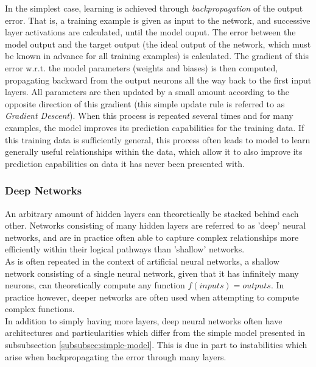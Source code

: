 In the simplest case, learning is achieved through \textit{backpropagation} of the output error. That is, a training example is given as input to the network, and successive layer activations are calculated, until the model ouput. The error between the model output and the target output (the ideal output of the network, which must be known in advance for all training examples) is calculated. The gradient of this error w.r.t. the model parameters (weights and biases) is then computed, propagating backward from the output neurons all the way back to the first input layers. All parameters are then updated by a small amount according to the opposite direction of this gradient (this simple update rule is referred to as \textit{Gradient Descent}). When this process is repeated several times and for many examples, the model improves its prediction capabilities for the training data. If this training data is sufficiently general, this process often leads to model to learn generally useful relationships within the data, which allow it to also improve its prediction capabilities on data it has never been presented with.\\

\subsubsection{Deep Networks}

An arbitrary amount of hidden layers can theoretically be stacked behind each other. Networks consisting of many hidden layers are referred to as 'deep' neural networks, and are in practice often able to capture complex relationships more efficiently within their logical pathways than 'shallow' networks.\\

As is often repeated in the context of artificial neural networks, a shallow network consisting of a single neural network, given that it has infinitely many neurons, can theoretically compute any function $f(inputs) = outputs$. In practice however, deeper networks are often used when attempting to compute complex functions.\\

In addition to simply having more layers, deep neural networks often have architectures and particularities which differ from the simple model presented in subsubsection \ref{subsubsec:simple-model}. This is due in part to instabilities which arise when backpropagating the error through many layers.\\ 


